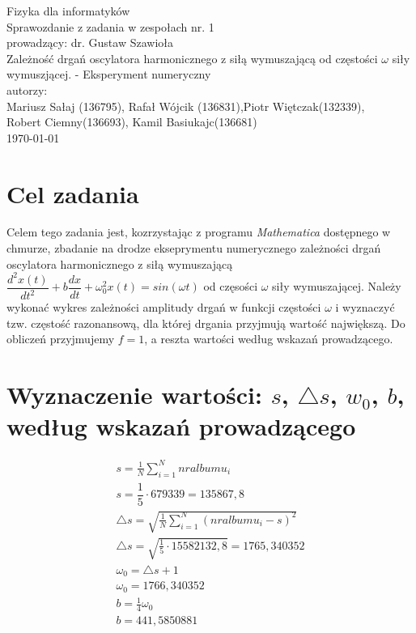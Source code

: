 \documentclass[polish,polish,a4paper]{article}
\title{}
\author{}
\begin{document}
	
	\begin{titlepage}
			\vspace*{\fill}
				    \begin{center}
				    {\Large Fizyka dla informatyków \\[0.1cm]
				    	Sprawozdanie z zadania w zespołach nr. 1\\[0.1cm]
			    		prowadzący: dr. Gustaw Szawioła\\[0.7cm]}
					{\huge Zależność drgań oscylatora harmonicznego z siłą wymuszającą od częstości $\omega$ siły wymuszjącej. - Eksperyment numeryczny}\\ [0.7cm]
					{\large autorzy:}\\[0.1cm]
					{\Large Mariusz Sałaj (136795), Rafał Wójcik (136831),Piotr Więtczak(132339),\\ [0.1cm]
						 Robert Ciemny(136693), Kamil Basiukajc(136681)}\\[0.5cm]
					\today
				\end{center}
			\vspace*{\fill}
	\end{titlepage}
	

			\section{Cel zadania}
		Celem tego zadania jest, kozrzystając z programu {\em Mathematica} dostępnego w chmurze, zbadanie na drodze ekseprymentu numerycznego zależności drgań oscylatora harmonicznego z siłą wymuszającą $\dfrac{d^{2}x(t)}{dt^{2}} + b \dfrac{dx}{dt} +
		\omega_{0}^2 x(t) = sin(\omega t)$ od częsości $ \omega $ siły wymuszającej. Należy wykonać wykres zależności amplitudy drgań w funkcji częstości $ \omega $ i wyznaczyć tzw. częstość razonansową, dla której drgania 
		przyjmują wartość największą. Do obliczeń przyjmujemy $f=1$, a reszta wartości według wskazań prowadzącego.
		
		\section{Wyznaczenie wartości: $s$, $\triangle s$, $w_{0}$, $b$, według wskazań prowadzącego}
		\begin{gather*}
		s = \frac{1}{N}\sum_{i=1}^{N} nralbumu_{i}\\
		s = \dfrac{1}{5} \cdot 679339 = 135867,8\\
		\triangle s = \sqrt{\frac{1}{N}\sum_{i=1}^{N} (nralbumu_{i} -s)^2}\\
		\triangle s = \sqrt{\frac{1}{5} \cdot 15582132,8} = 1765,340352\\
		\omega_{0} = \triangle s + 1\\
		\omega_{0} = 1766,340352\\
		b = \frac{1}{4}\omega_{0}\\
		b= 441,5850881\\
		\end{gather*}
		
\end{document}
